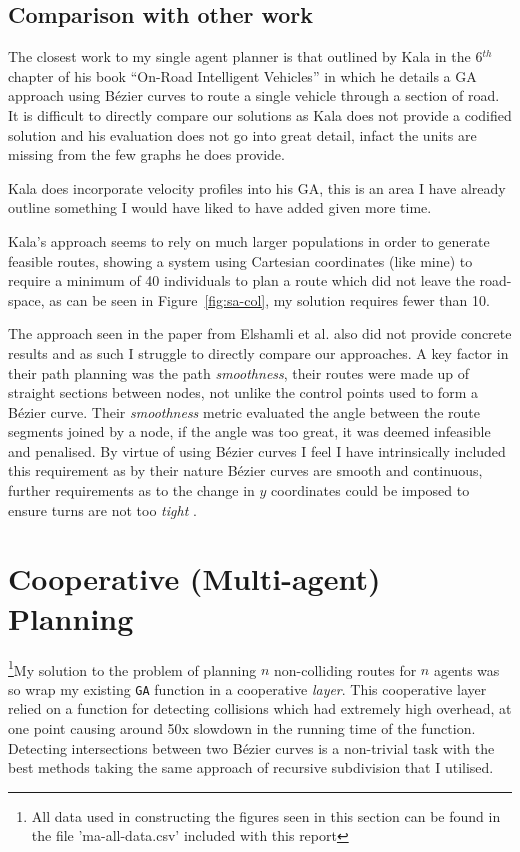 \subsection{Comparison with other work}

The closest work to my single agent planner is that outlined by Kala in the 6$^{th}$ chapter of his book ``On-Road Intelligent Vehicles'' in which he details a GA approach using Bézier curves to route a single vehicle through a section of road. It is difficult to directly compare our solutions as Kala does not provide a codified solution and his evaluation does not go into great detail, infact the units are missing from the few graphs he does provide.

Kala does incorporate velocity profiles into his GA, this is an area I have already outline something I would have liked to have added given more time.

Kala's approach seems to rely on much larger populations in order to generate feasible routes, showing a system using Cartesian coordinates (like mine) to require a minimum of 40 individuals to plan a route which did not leave the road-space, as can be seen in Figure~\ref{fig:sa-col}, my solution requires fewer than 10.

The approach seen in the paper from Elshamli et al.\cite{elshamliGeneticAlgorithmDynamic2004} also did not provide concrete results and as such I struggle to directly compare our approaches. A key factor in their path planning was the path \textit{smoothness}, their routes were made up of straight sections between nodes, not unlike the control points used to form a Bézier curve. Their \textit{smoothness} metric evaluated the angle between the route segments joined by a node, if the angle was too great, it was deemed infeasible and penalised. By virtue of using Bézier curves I feel I have intrinsically included this requirement as by their nature Bézier curves are smooth and continuous, further requirements as to the change in $y$ coordinates could be imposed to ensure turns are not too \textit{tight} .

\section{Cooperative (Multi-agent) Planning}
\label{subsec:eval-cooperativeplanning}

\footnote{All data used in constructing the figures seen in this section can be found in the file 'ma-all-data.csv' included with this report}My solution to the problem of planning $n$ non-colliding routes for $n$ agents was so wrap my existing \texttt{GA} function in a cooperative \textit{layer}. This cooperative layer relied on a function for detecting collisions which had extremely high overhead, at one point causing around 50x slowdown in the running time of the function. Detecting intersections between two Bézier curves is a non-trivial task with the best methods taking the same approach of recursive subdivision that I utilised.

